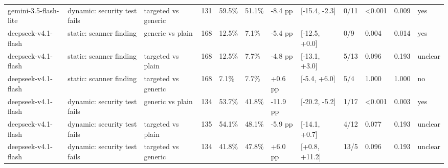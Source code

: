 \begin{table}[t]
\begin{tabular}{llllllllllll}
gemini-3.5-flash-lite & dynamic: security test fails & targeted vs generic & 131 & 59.5\% & 51.1\% & -8.4 pp & [-15.4, -2.3] & 0/11 & <0.001 & 0.009 & yes \\
deepseek-v4.1-flash & static: scanner finding & generic vs plain & 168 & 12.5\% & 7.1\% & -5.4 pp & [-12.5, +0.0] & 0/9 & 0.004 & 0.014 & yes \\
deepseek-v4.1-flash & static: scanner finding & targeted vs plain & 168 & 12.5\% & 7.7\% & -4.8 pp & [-13.1, +3.0] & 5/13 & 0.096 & 0.193 & unclear \\
deepseek-v4.1-flash & static: scanner finding & targeted vs generic & 168 & 7.1\% & 7.7\% & +0.6 pp & [-5.4, +6.0] & 5/4 & 1.000 & 1.000 & no \\
deepseek-v4.1-flash & dynamic: security test fails & generic vs plain & 134 & 53.7\% & 41.8\% & -11.9 pp & [-20.2, -5.2] & 1/17 & <0.001 & 0.003 & yes \\
deepseek-v4.1-flash & dynamic: security test fails & targeted vs plain & 135 & 54.1\% & 48.1\% & -5.9 pp & [-14.1, +0.7] & 4/12 & 0.077 & 0.193 & unclear \\
deepseek-v4.1-flash & dynamic: security test fails & targeted vs generic & 134 & 41.8\% & 47.8\% & +6.0 pp & [+0.8, +11.2] & 13/5 & 0.096 & 0.193 & unclear \\
\bottomrule
\end{tabular}
\end{table}
